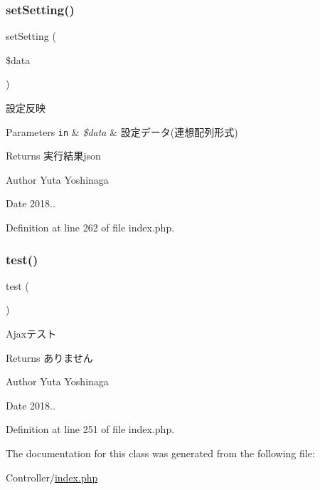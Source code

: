 \subsubsection{\texorpdfstring{set\+Setting()}{setSetting()}}
{\footnotesize\ttfamily set\+Setting (\begin{DoxyParamCaption}\item[{}]{\$data }\end{DoxyParamCaption})}



設定反映 


\begin{DoxyParams}[1]{Parameters}
\mbox{\tt in}  & {\em \$data} & 設定データ(連想配列形式) \\
\hline
\end{DoxyParams}
\begin{DoxyReturn}{Returns}
実行結果json 
\end{DoxyReturn}
\begin{DoxyAuthor}{Author}
Yuta Yoshinaga 
\end{DoxyAuthor}
\begin{DoxyDate}{Date}
2018.. 
\end{DoxyDate}


Definition at line 262 of file index.\+php.

\mbox{\label{class_c_ajax_utility_ad69dd4607977cae05ebe19d1ae604fb1}} 
\subsubsection{\texorpdfstring{test()}{test()}}
{\footnotesize\ttfamily test (\begin{DoxyParamCaption}{ }\end{DoxyParamCaption})}



Ajaxテスト 

\begin{DoxyReturn}{Returns}
ありません 
\end{DoxyReturn}
\begin{DoxyAuthor}{Author}
Yuta Yoshinaga 
\end{DoxyAuthor}
\begin{DoxyDate}{Date}
2018.. 
\end{DoxyDate}


Definition at line 251 of file index.\+php.



The documentation for this class was generated from the following file\+:\begin{DoxyCompactItemize}
\item 
Controller/\hyperlink{index_8php}{index.\+php}\end{DoxyCompactItemize}
